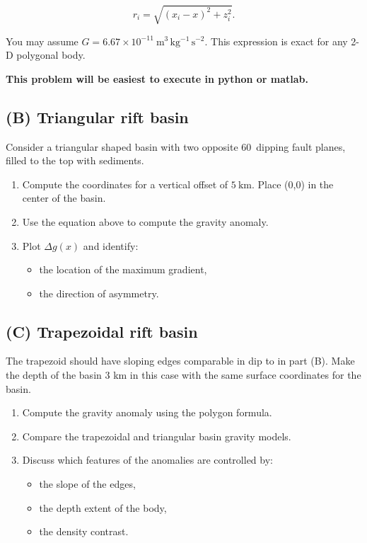 \documentclass[11pt,a4paper,final]{article}
\begin{document}
\[
r_i = \sqrt{(x_i - x)^2 + z_i^2}.
\]

You may assume $G = 6.67 \times 10^{-11}~\mathrm{m^3\,kg^{-1}\,s^{-2}}$.
This expression is exact for any 2-D polygonal body.

\textbf{This problem will be easiest to execute in python or matlab.}

\subsection*{(B) Triangular rift basin}

Consider a triangular shaped basin with two opposite 60\textdegree\ dipping fault planes, filled to the top with sediments.
\begin{enumerate}
    \item Compute the coordinates for a vertical offset of $5~\mathrm{km}$. Place (0,0) in the center of the basin.
    \item Use the equation above to compute the gravity anomaly.
    \item Plot $\Delta g(x)$ and identify:
    \begin{itemize}
        \item the location of the maximum gradient,
        \item the direction of asymmetry.
    \end{itemize}
\end{enumerate}


\subsection*{(C) Trapezoidal rift basin}

The trapezoid should have sloping edges comparable in dip to in part (B). Make the depth of the basin 3 km in this case with the same surface coordinates for the basin.

\begin{enumerate}
\item Compute the gravity anomaly using the polygon formula.
\item Compare the trapezoidal and triangular basin gravity models.
\item Discuss which features of the anomalies are controlled by:
  \begin{itemize}
  \item the slope of the edges,
  \item the depth extent of the body,
  \item the density contrast.
  \end{itemize}
\end{enumerate}
\end{document}
